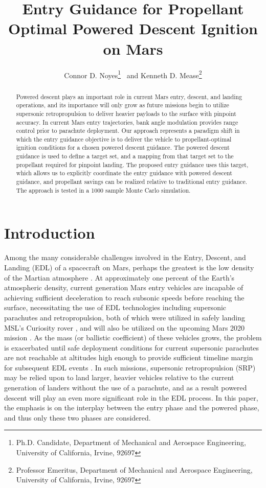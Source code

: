 \documentclass[letterpaper, paper,11pt]{AAS}
\title{Entry Guidance for Propellant Optimal Powered Descent Ignition on Mars}
\begin{document}
\author{Connor D. Noyes\thanks{Ph.D. Candidate, Department of Mechanical and Aerospace Engineering, University of California, Irvine, 92697} \ and Kenneth D. Mease\thanks{Professor Emeritus, Department of Mechanical and Aerospace Engineering, University of California, Irvine, 92697}}
\maketitle

\begin{abstract}
Powered descent plays an important role in current Mars entry, descent, and landing operations, and its importance will only grow as future missions begin to utilize supersonic retropropulsion to deliver heavier payloads to the surface with pinpoint accuracy. In current Mars entry trajectories, bank angle modulation provides range control prior to parachute deployment. Our approach represents a paradigm shift in which the entry guidance objective is to deliver the vehicle to propellant-optimal ignition conditions for a chosen powered descent guidance. The powered descent guidance is used to define a target set, and a mapping from that target set to the propellant required for pinpoint landing. The proposed entry guidance uses this target, which allows us to explicitly coordinate the entry guidance with powered descent guidance, and propellant savings can be realized relative to traditional entry guidance.  The approach is tested in a 1000 sample Monte Carlo simulation.
\end{abstract}

\section{Introduction}
Among the many considerable challenges involved in the Entry, Descent, and Landing (EDL) of a spacecraft on Mars, perhaps the greatest is the low density of the Martian atmosphere \cite{BraunMarsEDL, joel_dissertation}. At approximately one percent of the Earth's atmospheric density, current generation Mars entry vehicles are incapable of achieving sufficient deceleration to reach subsonic speeds before reaching the surface, necessitating the use of EDL technologies including supersonic parachutes and retropropulsion, both of which were utilized in safely landing MSL's Curiosity rover \cite{MSL_EDL}, and will also be utilized on the upcoming Mars 2020 mission \cite{M2020_EDL}. As the mass (or ballistic coefficient) of these vehicles grows, the problem is exacerbated until safe deployment conditions for current supersonic parachutes are not reachable at altitudes high enough to provide sufficient timeline margin for subsequent EDL events \cite{BraunMarsEDL}. In such missions, supersonic retropropulsion (SRP) may be relied upon to land larger, heavier vehicles relative to the current generation of landers without the use of a parachute, and as a result powered descent will play an even more significant role in the EDL process. In this paper, the emphasis is on the interplay between the entry phase and the powered phase, and thus only these two phases are considered.
\end{document}
